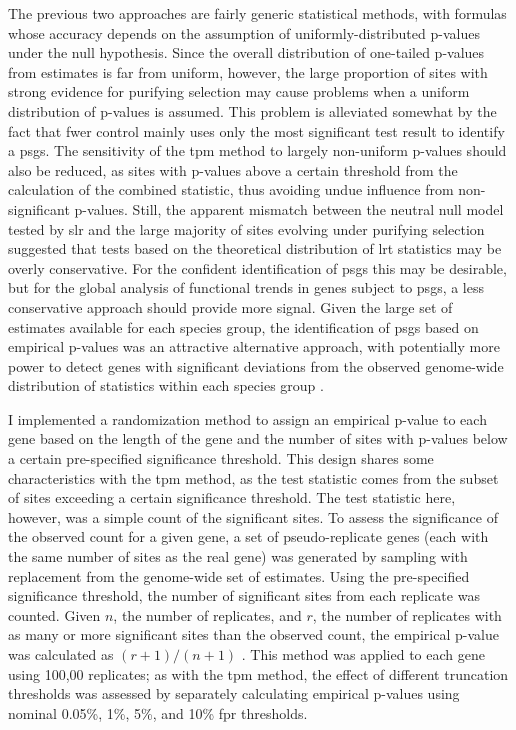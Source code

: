 The previous two approaches are fairly generic statistical methods,
with formulas whose accuracy depends on the assumption of
uniformly-distributed p-values under the null hypothesis. Since the
overall distribution of one-tailed p-values from \sw estimates is far
from uniform, however, the large proportion of sites with strong
evidence for purifying selection may cause problems when a uniform
distribution of p-values is assumed. This problem is alleviated
somewhat by the fact that \ac{fwer} control mainly uses only the most
significant test result to identify a \acp{psg}. The sensitivity of
the \ac{tpm} method to largely non-uniform p-values should also be
reduced, as sites with p-values above a certain threshold from the
calculation of the combined statistic, thus avoiding undue influence
from non-significant p-values. Still, the apparent mismatch between
the neutral null model tested by \ac{slr} and the large majority of
sites evolving under purifying selection suggested that tests based on
the theoretical distribution of \ac{lrt} statistics may be overly
conservative. For the confident identification of \acp{psg} this may
be desirable, but for the global analysis of functional trends in
genes subject to \acp{psg}, a less conservative approach should
provide more signal. Given the large set of \sw estimates available
for each species group, the identification of \acp{psg} based on
empirical p-values was an attractive alternative approach, with
potentially more power to detect genes with significant deviations
from the observed genome-wide distribution of \slrt statistics within
each species group \citep{Noble2009a}.

I implemented a randomization method to assign an empirical p-value to
each gene based on the length of the gene and the number of sites with
p-values below a certain pre-specified significance threshold. This
design shares some characteristics with the \ac{tpm} method, as the
test statistic comes from the subset of sites exceeding a certain
significance threshold. The test statistic here, however, was a simple
count of the significant sites. To assess the significance of the
observed count for a given gene, a set of pseudo-replicate genes (each
with the same number of sites as the real gene) was generated by
sampling with replacement from the genome-wide set of \sw
estimates. Using the pre-specified significance threshold, the number
of significant sites from each replicate was counted. Given $n$, the
number of replicates, and $r$, the number of replicates with as many
or more significant sites than the observed count, the empirical
p-value was calculated as $(r+1) / (n+1)$ \citep{North2002}. This
method was applied to each gene using 100,00 replicates; as with the
\ac{tpm} method, the effect of different truncation thresholds was
assessed by separately calculating empirical p-values using nominal
0.05\%, 1\%, 5\%, and 10\% \ac{fpr} thresholds.

